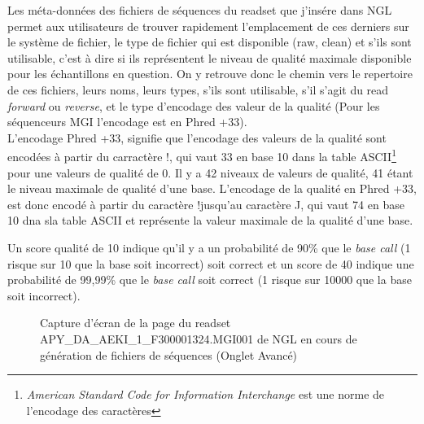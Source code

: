 Les méta-données des fichiers de séquences du readset que j'insére dans NGL permet aux utilisateurs de trouver rapidement l'emplacement de ces derniers sur le système de fichier, le type de fichier qui est disponible (\og raw\fg{}, \og clean\fg{}) et s'ils sont \og utilisable\fg{}, c'est à dire si ils représentent le niveau de qualité maximale disponible pour les échantillons en question.
On y retrouve donc le chemin vers le repertoire de ces fichiers, leurs noms, leurs types, s'ils sont utilisable, s'il s'agit du read \emph{forward} ou \emph{reverse}, et le type d'encodage des valeur de la qualité (Pour les séquenceurs MGI l'encodage est en Phred +33).\\

L'encodage Phred +33, signifie que l'encodage des valeurs de la qualité sont encodées à partir du carractère \og !\fg{}, qui vaut 33 en base 10 dans la table ASCII\footnote{\emph{American Standard Code for Information Interchange} est une norme de l'encodage des caractères} pour une valeurs de qualité de 0. Il y a 42 niveaux de valeurs de qualité, 41 étant le niveau maximale de qualité d'une base. L'encodage de la qualité en Phred +33, est donc encodé à partir du caractère \og !\fg jusqu'au caractère \og J\fg{}, qui vaut 74 en base 10 dna sla table ASCII et représente la valeur maximale de la qualité d'une base.

Un score qualité de 10 indique qu'il y a un probabilité de 90\% que le \emph{base call} (1 risque sur 10 que la base soit incorrect) soit correct et un score de 40 indique une probabilité de 99,99\% que le \emph{base call} soit correct (1 risque sur 10000 que la base soit incorrect).

\begin{figure}[H]
    \centering
    \caption{\footnotesize{Capture d'écran de la page du readset APY\_DA\_AEKI\_1\_F300001324.MGI001 de NGL en cours de génération de fichiers de séquences (Onglet \og Avancé\fg{})}}
    \label{meta-data-fastq}
\end{figure}

